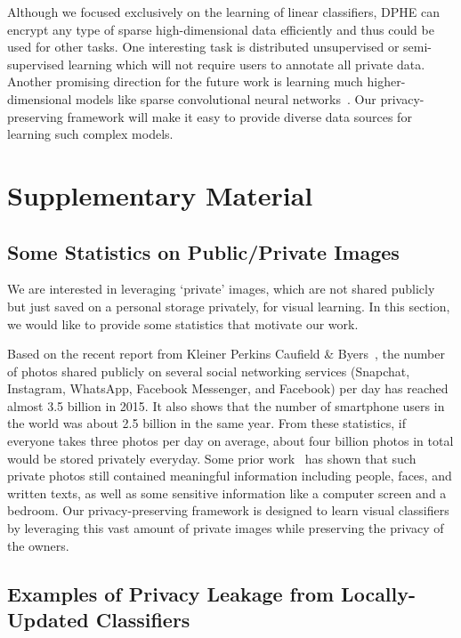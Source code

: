 \documentclass[10pt,twocolumn,letterpaper]{article}
\begin{document}
Although we focused exclusively on the learning of linear classifiers, DPHE can encrypt any type of sparse high-dimensional data efficiently and thus could be used for other tasks. One interesting task is distributed unsupervised or semi-supervised learning which will not require users to annotate all private data. Another promising direction for the future work is learning much higher-dimensional models like sparse convolutional neural networks~\cite{BaoyuanLiu2015,Sun2016a}. Our privacy-preserving framework will make it easy to provide diverse data sources for learning such complex models.

\appendix

\section{Supplementary Material}
\subsection{Some Statistics on Public/Private Images}
We are interested in leveraging `private' images, which are not shared publicly but just saved on a personal storage privately, for visual learning. In this section, we would like to provide some statistics that motivate our work.

Based on the recent report from Kleiner Perkins Caufield \& Byers~\cite{Meeker2016}, the number of photos shared publicly on several social networking services (Snapchat, Instagram, WhatsApp, Facebook Messenger, and Facebook) per day has reached almost 3.5 billion in 2015. It also shows that the number of smartphone users in the world was about 2.5 billion in the same year. From these statistics, if everyone takes three photos per day on average, about four billion photos in total would be stored privately everyday. Some prior work~\cite{Hoyle2015,Hoyle2014} has shown that such private photos still contained meaningful information including people, faces, and written texts, as well as some sensitive information like a computer screen and a bedroom. Our privacy-preserving framework is designed to learn visual classifiers by leveraging this vast amount of private images while preserving the privacy of the owners.

\subsection{Examples of Privacy Leakage from Locally-Updated Classifiers}
\end{document}
